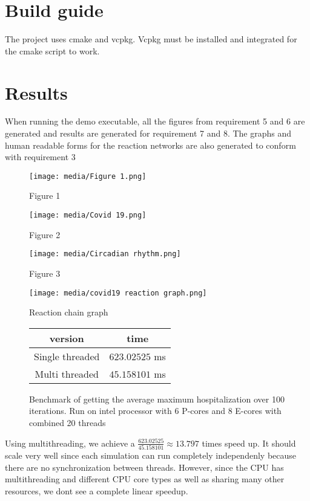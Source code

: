 \section{Build guide}
The project uses cmake and vcpkg. Vcpkg must be installed and integrated for the cmake script to work.

\section {Results}

When running the demo executable, all the figures from requirement 5 and 6 are generated and results are generated for requirement 7 and 8.
The graphs and human readable forms for the reaction networks are also generated to conform with requirement 3

\begin{figure}[H]
    \centering
    \texttt{[image: media/Figure 1.png]}
    \caption{Figure 1}
\end{figure}

\begin{figure}[H]
    \centering
    \texttt{[image: media/Covid 19.png]}
    \caption{Figure 2}
\end{figure}

\begin{figure}[H]
    \centering
    \texttt{[image: media/Circadian rhythm.png]}
    \caption{Figure 3}
\end{figure}

\begin{figure}[H]
    \centering
    \texttt{[image: media/covid19 reaction graph.png]}
    \caption{Reaction chain graph}
\end{figure}

\begin{figure}[H]
    \centering
    \begin{tabular}{ c c }
        \hline
        version & time \\
        \hline
        Single threaded & $623.02525$ ms \\
        Multi threaded & $45.158101$ ms \\
        \hline
    \end{tabular}
    \caption{Benchmark of getting the average maximum hospitalization over 100 iterations. Run on  intel processor with 6 P-cores and 8 E-cores with combined 20 threads}
\end{figure}

Using multithreading, we achieve a $\frac{623.02525}{45.158101}\approx13.797$ times speed up. It should scale very well since each simulation can run completely independenly because there are no synchronization between threads. However, since the CPU has multithreading and different CPU core types as well as sharing many other resources, we dont see a complete linear speedup.
\FloatBarrier
\newpage